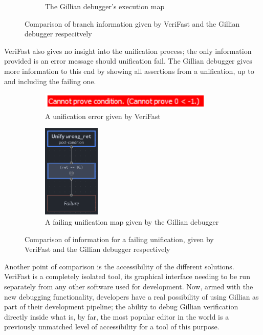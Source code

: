 \begin{figure}
\begin{subfigure}[b]{0.4\textwidth}
    \caption{The Gillian debugger's execution map}%
    \label{fig:execmap-final}
  \end{subfigure}
  \caption{Comparison of branch information given by VeriFast and the Gillian
  debugger respecitvely}%
  \label{fig:verifast-path-compare}
\end{figure}

VeriFast also gives no insight into the unification process; the only
information provided is an error message should unification fail. The Gillian
debugger gives more information to this end by showing all assertions from
a unification, up to and including the failing one.

\begin{figure}
  \centering
  \begin{subfigure}[b]{0.4\textwidth}
    \center{}
    \includegraphics[width=0.9\textwidth]{img/verifast-error.png}
    \caption{A unification error given by VeriFast}%
    \label{fig:verifast-error}
  \end{subfigure}
  \qquad
  \begin{subfigure}[b]{0.4\textwidth}
    \centering
    \includegraphics[width=0.3\textwidth]{img/unifymap-failure.png}
    \caption{A failing unification map given by the Gillian debugger}%
    \label{fig:unifymap-failure}
  \end{subfigure}
  \caption{Comparison of information for a failing unification, given by
  VeriFast and the Gillian debugger respectively}%
  \label{fig:verifast-unifyfail-compare}
\end{figure}

Another point of comparison is the accessibility of the different solutions.
VeriFast is a completely isolated tool, its graphical interface needing to be
run separately from any other software used for development. Now, armed with the
new debugging functionality, developers have a real possibility of using Gillian
as part of their development pipeline; the ability to debug Gillian verification
directly inside what is, by far, the most popular editor in the world is a
previously unmatched level of accessibility for a tool of this purpose.


